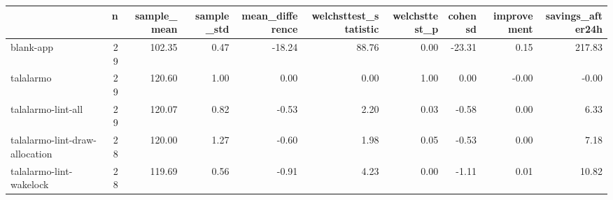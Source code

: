 \begin{tabular}{lrrrrrrrrr}
\toprule
{} &   n &  sample\_mean &  sample\_std &  mean\_difference &  welchsttest\_statistic &  welchsttest\_p &  cohensd &  improvement &  savings\_after24h \\
\midrule
blank-app                      &  29 &       102.35 &        0.47 &           -18.24 &                  88.76 &           0.00 &   -23.31 &         0.15 &            217.83 \\
talalarmo                      &  29 &       120.60 &        1.00 &             0.00 &                   0.00 &           1.00 &     0.00 &        -0.00 &             -0.00 \\
talalarmo-lint-all             &  29 &       120.07 &        0.82 &            -0.53 &                   2.20 &           0.03 &    -0.58 &         0.00 &              6.33 \\
talalarmo-lint-draw-allocation &  28 &       120.00 &        1.27 &            -0.60 &                   1.98 &           0.05 &    -0.53 &         0.00 &              7.18 \\
talalarmo-lint-wakelock        &  28 &       119.69 &        0.56 &            -0.91 &                   4.23 &           0.00 &    -1.11 &         0.01 &             10.82 \\
\bottomrule
\end{tabular}
